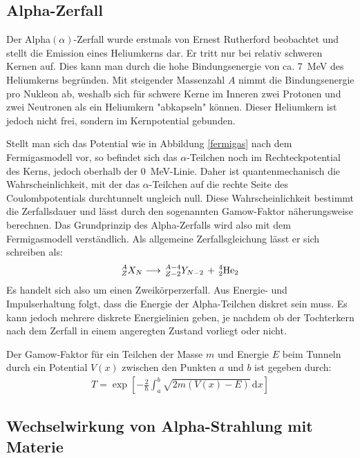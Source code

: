 \subsection{Alpha-Zerfall}

Der Alpha$(\alpha) $-Zerfall wurde erstmals von Ernest Rutherford beobachtet und stellt die Emission eines Heliumkerns dar.
Er tritt nur bei relativ schweren Kernen auf.
Dies kann man durch die hohe Bindungsenergie von ca. \SI{7}{\mega\electronvolt} des Heliumkerns begründen.
Mit steigender Massenzahl $A$ nimmt die Bindungsenergie pro Nukleon ab, weshalb sich für schwere Kerne im Inneren zwei Protonen und zwei Neutronen als ein Heliumkern "abkapseln" können.
Dieser Heliumkern ist jedoch nicht frei, sondern im Kernpotential gebunden. 

Stellt man sich das Potential wie in Abbildung \ref{fermigas} nach dem Fermigasmodell vor, so befindet sich das $\alpha$-Teilchen noch im Rechteckpotential des Kerns, jedoch oberhalb der \SI{0}{\mega\electronvolt}-Linie.
Daher ist quantenmechanisch die Wahrscheinlichkeit, mit der das $\alpha$-Teilchen auf die rechte Seite des Coulombpotentials durchtunnelt ungleich null.
Diese Wahrscheinlichkeit bestimmt die Zerfallsdauer und lässt durch den sogenannten Gamow-Faktor näherungsweise berechnen.
Das Grundprinzip des Alpha-Zerfalls wird also mit dem Fermigasmodell verständlich.
Als allgemeine Zerfallsgleichung lässt er sich schreiben als:
\begin{align*}
^A_ZX_N\longrightarrow \,^{A-4}_{Z-2}Y_{N-2} \,+ \,^4_2\textnormal{He}_2
\end{align*}
Es handelt sich also um einen Zweikörperzerfall. Aus Energie- und Impulserhaltung folgt, dass die Energie der Alpha-Teilchen diskret sein muss. Es kann jedoch mehrere diskrete Energielinien geben, je nachdem ob der Tochterkern nach dem Zerfall in einem angeregten Zustand vorliegt oder nicht. 

Der Gamow-Faktor für ein Teilchen der Masse $m$ und Energie $E$ beim Tunneln durch ein Potential $V(x)$ zwischen den Punkten $a$ und $b$ ist gegeben durch:
\begin{align}
	T=\exp\left[ -\frac{2}{\hbar}\int_{a}^{b}\sqrt{2m\left( V(x)-E\right) }\,\text{d}x\right] 
\end{align}

\subsection{Wechselwirkung von Alpha-Strahlung mit Materie}

